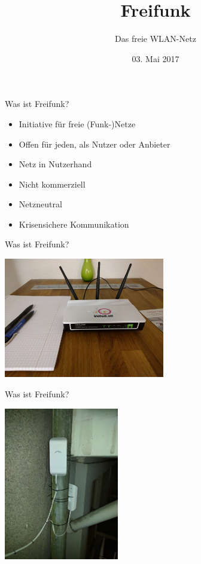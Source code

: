 \documentclass[t]{beamer}
\title{Freifunk}
\author{Das freie WLAN-Netz} %
\date{03. Mai 2017}
\begin{document}
  \maketitle

  \begin{frame}{Was ist Freifunk?}
    \begin{itemize}
      \item Initiative für freie (Funk-)Netze
      \item Offen für jeden, als Nutzer oder Anbieter
      \item Netz in Nutzerhand
      \item Nicht kommerziell
      \item Netzneutral
      \item Krisensichere Kommunikation
    \end{itemize}
  \end{frame}

  \begin{frame}{Was ist Freifunk?}
    \begin{center}
      \includegraphics[width=7cm]{images/homerouter}
    \end{center}
  \end{frame}
  
  \begin{frame}{Was ist Freifunk?}
    \begin{center}
      \includegraphics[width=5cm]{images/irl/wilhelminenstr2}
    \end{center}
  \end{frame}
  
\end{document}
